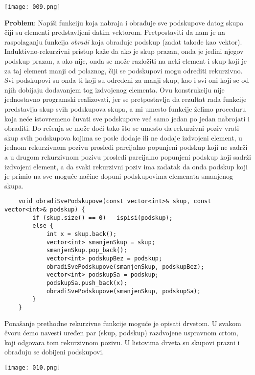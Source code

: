 \documentclass{article}
\begin{document}
\begin{center}
    \texttt{[image: 009.png]}
\end{center}
\textbf{Problem}: Napiši funkciju koja nabraja i obrađuje sve podskupove datog skupa
čiji su elementi predstavljeni datim vektorom. Pretpostaviti da nam je na
raspolaganju funkcija \textit{obradi} koja obrađuje podskup (zadat takođe kao vektor).
\newline
Induktivno-rekurzivni pristup kaže da ako je skup prazan, onda je jedini njegov
podskup prazan, a ako nije, onda se može razložiti na neki element i skup koji je
za taj element manji od polaznog, čiji se podskupovi mogu odrediti rekurzivno.
Svi podskupovi su onda ti koji su određeni za manji skup, kao i svi oni koji se
od njih dobijaju dodavanjem tog izdvojenog elementa. Ovu konstrukciju nije
jednostavno programski realizovati, jer se pretpostavlja da rezultat rada funkcije
predstavlja skup svih podskupova skupa, a mi umesto funkcije želimo proceduru
koja neće istovremeno čuvati sve podskupove već samo jedan po jedan nabrojati
i obraditi. Do rešenja se može doći tako što se umesto da rekurzivni poziv vrati
skup svih podskupova kojima se posle dodaje ili ne dodaje izdvojeni element,
u jednom rekurzivnom pozivu prosledi parcijalno popunjeni podskup koji ne
sadrži a u drugom rekurzivnom pozivu prosledi parcijalno popunjeni podskup
koji sadrži izdvojeni element, a da svaki rekurzivni poziv ima zadatak da onda
podskup koji je primio na sve moguće načine dopuni podskupovima elemenata
smanjenog skupa.
\begin{lstlisting}
    void obradiSvePodskupove(const vector<int>& skup, const vector<int>& podskup) {
        if (skup.size() == 0)   ispisi(podskup);
        else {
            int x = skup.back();
            vector<int> smanjenSkup = skup;
            smanjenSkup.pop_back();
            vector<int> podskupBez = podskup;
            obradiSvePodskupove(smanjenSkup, podskupBez);
            vector<int> podskupSa = podskup;
            podskupSa.push_back(x);
            obradiSvePodskupove(smanjenSkup, podskupSa);
        }
    }
\end{lstlisting}
Ponašanje prethodne rekurzivne funkcije moguće je opisati drvetom. U svakom
čvoru ćemo navesti uređen par (skup, podskup) razdvojene uspravnom crtom,
koji odgovara tom rekurzivnom pozivu. U listovima drveta su skupovi prazni i
obrađuju se dobijeni podskupovi.
\begin{center}
    \texttt{[image: 010.png]}
\end{center}
\end{document}
